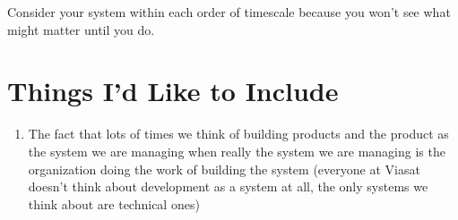 \documentclass[11pt,a5paper]{book}
\begin{document}
Consider your system within each order of timescale because you won't see what might matter until you do.

\chapter{Things I'd Like to Include}
\begin{enumerate}
\item The fact that lots of times we think of building products and the product as the system we are managing when really the system we are managing is the organization doing the work of building the system (everyone at Viasat doesn't think about development as a system at all, the only systems we think about are technical ones)
\end{enumerate}



\end{document}
